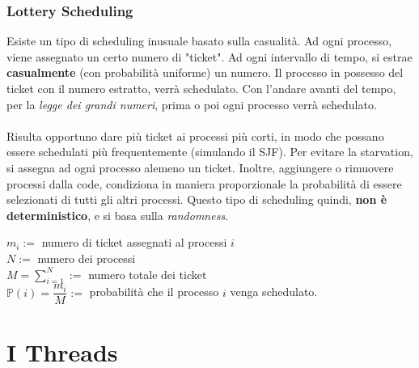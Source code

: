 \documentclass[12pt, letterpaper]{article}
\newcommand{\acc}{\\\hphantom{}\\}
\begin{document}
\subsubsection{Lottery Scheduling} 
Esiste un tipo di scheduling inusuale basato sulla casualità. Ad ogni processo, viene assegnato un certo 
numero di "ticket". Ad ogni intervallo di tempo, si estrae \textbf{casualmente} (con probabilità uniforme) un 
numero. Il processo in possesso del ticket con il numero estratto, verrà schedulato. Con l'andare avanti del tempo, 
per la \textit{legge dei grandi numeri}, prima o poi ogni processo verrà schedulato. \acc 
Risulta opportuno dare più ticket ai processi più corti, in modo che possano essere schedulati 
più frequentemente (simulando il SJF). Per evitare la starvation, si assegna ad ogni processo 
alemeno un ticket. Inoltre, aggiungere o rimuovere processi dalla code, condiziona in maniera proporzionale 
la probabilità di essere selezionati di tutti gli altri processi. Questo tipo di scheduling quindi, \textbf{non è 
deterministico}, e si basa sulla \textit{randomness}.\begin{center}
    \(m_i:=\)  numero di ticket assegnati al processi \(i\)\\\(N:=\) numero dei processi \\\(M=\displaystyle\sum_{i=1}^N:=\) numero totale dei ticket\\
\(\mathbb{P}(i)=\dfrac{m_i}{M}:=\) probabilità che il processo \(i\) venga schedulato.
\end{center}
\section{I Threads}
\end{document}
